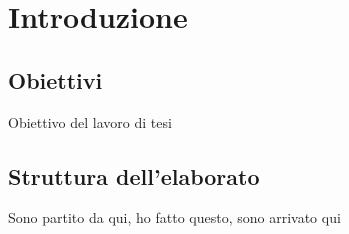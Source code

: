 \chapter{Introduzione}

\section{Obiettivi}

Obiettivo del lavoro di tesi

\section{Struttura dell'elaborato}

Sono partito da qui, ho fatto questo, sono arrivato qui
